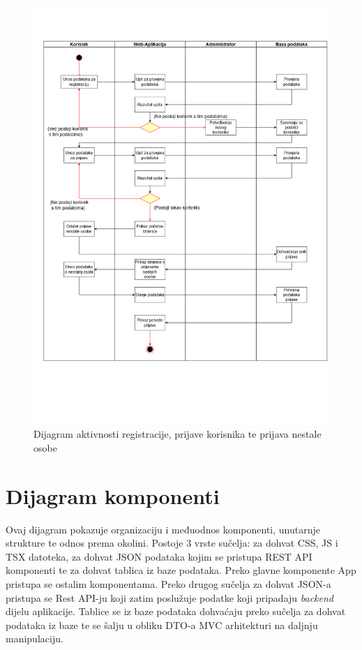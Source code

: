             \begin{figure}[H]
			         \includegraphics[scale=0.37]{dijagrami/DijagramAktivnosti.png} %
			         \centering
			         \caption{Dijagram aktivnosti registracije, prijave korisnika te prijava nestale osobe}
			         \label{fig:promjene}
		      \end{figure}
			
			\eject
		\section{Dijagram komponenti}
		
			\par
			Ovaj dijagram pokazuje organizaciju i međuodnos komponenti, unutarnje strukture te odnos prema okolini. Postoje 3 vrste sučelja: za dohvat CSS, JS i TSX datoteka, za dohvat JSON podataka kojim se pristupa REST API komponenti te za dohvat tablica iz baze podataka. Preko glavne komponente App pristupa se ostalim komponentama. Preko drugog sučelja za dohvat JSON-a pristupa se Rest API-ju koji zatim poslužuje podatke koji pripadaju \textit{backend} dijelu aplikacije. Tablice se iz baze podataka dohvaćaju preko sučelja za dohvat podataka iz baze te se šalju u obliku DTO-a MVC arhitekturi na daljnju manipulaciju.
			
